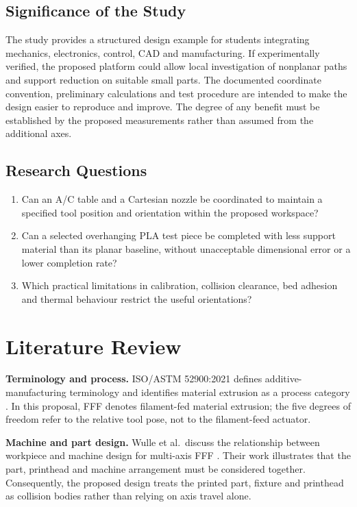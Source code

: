 \documentclass[12pt,a4paper]{article}
\providecommand{\tightlist}{\setlength{\itemsep}{0pt}\setlength{\parskip}{0pt}}
\begin{document}
\subsection{Significance of the Study}\label{significance-of-the-study}

The study provides a structured design example for students integrating mechanics, electronics, control,
  CAD and manufacturing. If experimentally verified, the proposed platform could allow local
  investigation of nonplanar paths and support reduction on suitable small parts. The documented
  coordinate convention, preliminary calculations and test procedure are intended to make the design
  easier to reproduce and improve. The degree of any benefit must be established by the proposed
  measurements rather than assumed from the additional axes.

\subsection{Research Questions}\label{research-questions}

\begin{enumerate}
\def\labelenumi{\arabic{enumi}.}
\tightlist
\item
  Can an A/C table and a Cartesian nozzle be coordinated to maintain a specified tool position and
  orientation within the proposed workspace?
\item
  Can a selected overhanging PLA test piece be completed with less support material than its planar
  baseline, without unacceptable dimensional error or a lower completion rate?
\item
  Which practical limitations in calibration, collision clearance, bed adhesion and thermal behaviour
  restrict the useful orientations?
\end{enumerate}

\clearpage
\section{Literature Review}\label{literature-review}

\textbf{Terminology and process.} ISO/ASTM 52900:2021 defines additive-manufacturing terminology and
  identifies material extrusion as a process category \cite{iso52900}. In this proposal, FFF denotes
  filament-fed material extrusion; the five degrees of freedom refer to the relative tool pose, not to
  the filament-feed actuator.

\textbf{Machine and part design.} Wulle et al.~discuss the relationship between workpiece and machine
  design for multi-axis FFF \cite{wulle2017}. Their work illustrates that the part, printhead and machine
  arrangement must be considered together. Consequently, the proposed design treats the printed part,
  fixture and printhead as collision bodies rather than relying on axis travel alone.
\end{document}

